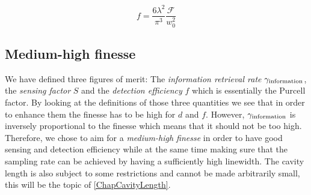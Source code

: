 \begin{equation}
	f=\frac{6\lambda^2}{\pi^3}\frac{\mathcal{F}}{w_0^2}
\end{equation}

\subsection{Medium-high finesse}
We have defined three figures of merit: The \textit{information retrieval rate} $\de{\gamma}{information}$, the \textit{sensing factor} $S$ and the \textit{detection efficiency} $f$ which is essentially the Purcell factor. By looking at the definitions of those three quantities we see that in order to enhance them the finesse has to be high for $d$ and $f$. However, $\de{\gamma}{information}$ is inversely proportional to the finesse which means that it should not be too high. Therefore, we chose to aim for a \textit{medium-high finesse} in order to have good sensing and detection efficiency while at the same time making sure that the sampling rate can be achieved by having a sufficiently high linewidth. The cavity length is also subject to some restrictions and cannot be made arbitrarily small, this will be the topic of \autoref{ChapCavityLength}.
